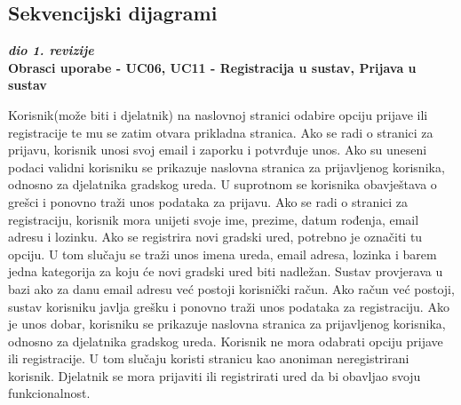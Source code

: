 				\eject		
				
			\subsection{Sekvencijski dijagrami}
				
				\textbf{\textit{dio 1. revizije}}\\
				
				\textbf{Obrasci uporabe - UC06, UC11 - Registracija u sustav, Prijava u sustav}
				
				Korisnik(može biti i djelatnik) na naslovnoj stranici odabire opciju prijave ili registracije te mu se zatim otvara prikladna stranica. Ako se radi o stranici za prijavu, korisnik unosi svoj email i zaporku i potvrđuje unos. Ako su uneseni podaci validni korisniku se prikazuje naslovna stranica za prijavljenog korisnika, odnosno za djelatnika gradskog ureda. U suprotnom se korisnika obavještava o grešci i ponovno traži unos podataka za prijavu. Ako se radi o stranici za registraciju, korisnik mora unijeti svoje ime, prezime, datum rođenja, email adresu i lozinku. Ako se registrira novi gradski ured, potrebno je označiti tu opciju. U tom slučaju se traži unos imena ureda, email adresa, lozinka i barem jedna kategorija za koju će novi gradski ured biti nadležan. Sustav provjerava u bazi ako za danu email adresu već postoji korisnički račun. Ako račun već postoji, sustav korisniku javlja grešku i ponovno traži unos podataka za registraciju. Ako je unos dobar, korisniku se prikazuje naslovna stranica za prijavljenog korisnika, odnosno za djelatnika gradskog ureda. Korisnik ne mora odabrati opciju prijave ili registracije. U tom slučaju koristi stranicu kao anoniman neregistrirani korisnik. Djelatnik se mora prijaviti ili registrirati ured da bi obavljao svoju funkcionalnost.
				

